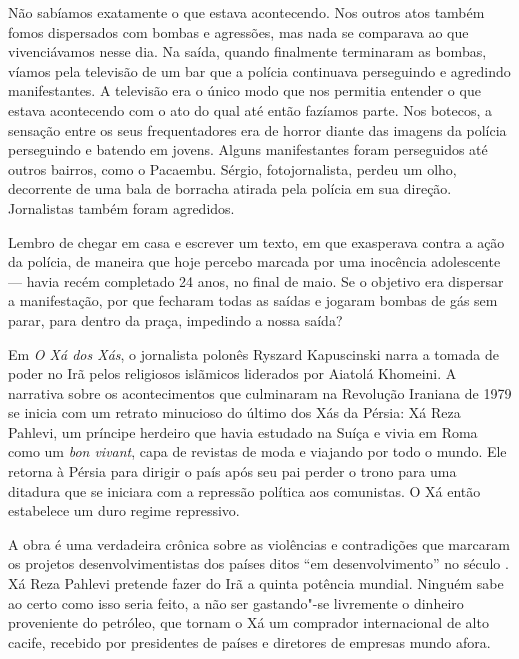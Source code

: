 Não sabíamos exatamente o que estava acontecendo. Nos outros atos também
fomos dispersados com bombas e agressões, mas nada se comparava ao que
vivenciávamos nesse dia. Na saída, quando finalmente terminaram as
bombas, víamos pela televisão de um bar que a polícia continuava
perseguindo e agredindo manifestantes. A televisão era o único modo que
nos permitia entender o que estava acontecendo com o ato do qual até
então fazíamos parte. Nos botecos, a sensação
entre os seus frequentadores era de horror diante das imagens da polícia
perseguindo e batendo em jovens. Alguns manifestantes foram perseguidos
até outros bairros, como o Pacaembu. Sérgio, fotojornalista, perdeu um olho, decorrente
de uma bala de borracha atirada pela polícia em sua direção. Jornalistas
também foram agredidos.

Lembro de chegar em casa e escrever um texto, em que exasperava contra
a ação da polícia, de maneira que hoje percebo marcada por uma inocência
adolescente --- havia recém completado 24 anos, no final de maio. Se o
objetivo era dispersar a manifestação, por que fecharam todas as saídas
e jogaram bombas de gás sem parar, para dentro da praça, impedindo a
nossa saída?

\asterisc

Em \emph{O Xá dos Xás}, o jornalista polonês Ryszard Kapuscinski narra a
tomada de poder no Irã pelos religiosos islãmicos liderados por Aiatolá
Khomeini. A narrativa sobre os acontecimentos que culminaram na
Revolução Iraniana de 1979 se inicia com um retrato minucioso do último
dos Xás da Pérsia: Xá Reza Pahlevi, um príncipe herdeiro que havia
estudado na Suíça e vivia em Roma como um \emph{bon vivant}, capa de
revistas de moda e viajando por todo o mundo. Ele retorna à Pérsia para
dirigir o país após seu pai perder o trono para uma ditadura que
se iniciara com a repressão política aos comunistas. O Xá então estabelece
um duro regime repressivo.

A obra é uma verdadeira crônica sobre as violências e contradições que
marcaram os projetos desenvolvimentistas dos países ditos ``em desenvolvimento'' no século .
Xá Reza Pahlevi pretende fazer do Irã a quinta potência mundial. Ninguém
sabe ao certo como isso seria feito, a não ser gastando"-se livremente o
dinheiro proveniente do petróleo, que tornam o Xá um comprador internacional
de alto cacife, recebido por presidentes de países e diretores
de empresas mundo afora.


